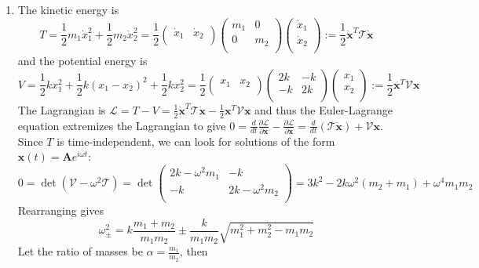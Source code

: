 \documentclass[a4paper]{article}
\begin{document}
\begin{ans}\leavevmode
\begin{enumerate}[label=(\roman*)]
\item The kinetic energy is
$$T=\frac{1}{2}m_1\dot{x}_1^2+\frac{1}{2}m_2\dot{x}_2^2=\frac{1}{2}\begin{pmatrix}\dot{x}_1&\dot{x}_2\\\end{pmatrix}\begin{pmatrix}m_1&0\\0&m_2\\\end{pmatrix}\begin{pmatrix}\dot{x}_1\\\dot{x}_2\\\end{pmatrix}:=\frac{1}{2}\mathbf{\dot{x}}^T\mathcal{T}\mathbf{\dot{x}}$$
and the potential energy is
$$V=\frac{1}{2}kx_1^2+\frac{1}{2}k(x_1-x_2)^2+\frac{1}{2}kx_2^2=\frac{1}{2}\begin{pmatrix}x_1&x_2\\\end{pmatrix}\begin{pmatrix}2k&-k\\-k&2k\\\end{pmatrix}\begin{pmatrix}x_1\\x_2\\\end{pmatrix}:=\frac{1}{2}\mathbf{x}^T\mathcal{V}\mathbf{x}$$
The Lagrangian is $\mathcal{L}=T-V=\frac{1}{2}\mathbf{\dot{x}}^T\mathcal{T}\mathbf{\dot{x}}-\frac{1}{2}\mathbf{x}^T\mathcal{V}\mathbf{x}$ and thus the Euler-Lagrange equation extremizes the Lagrangian to give $0=\frac{d}{dt}\frac{\partial\mathcal{L}}{\partial\mathbf{\dot{x}}}-\frac{\partial\mathcal{L}}{\partial\mathbf{x}}=\frac{d}{dt}(\mathcal{T}\mathbf{\dot{x}})+\mathcal{V}\mathbf{x}$. Since $T$ is time-independent, we can look for solutions of the form $\mathbf{x}(t)=\mathbf{A}e^{i\omega t}$:
$$0=\det(\mathcal{V}-\omega^2\mathcal{T})=\det\begin{pmatrix}2k-\omega^2m_1&-k\\-k&2k-\omega^2m_2\\\end{pmatrix}=3k^2-2k\omega^2(m_2+m_1)+\omega^4m_1m_2$$
Rearranging gives
$$\omega_\pm^2=k\frac{m_1+m_2}{m_1m_2}\pm\frac{k}{m_1m_2}\sqrt{m_1^2+m_2^2-m_1m_2}$$
Let the ratio of masses be $\alpha=\frac{m_1}{m_2}$, then

\end{enumerate}
\end{ans}
\end{document}
